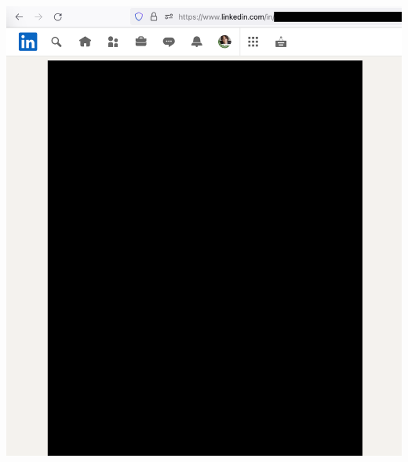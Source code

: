 
\begin{center}
    \includegraphics[width=36em]{ide-linkedin-p1_public}
\end{center}
\WillContinue
\pagebreak

